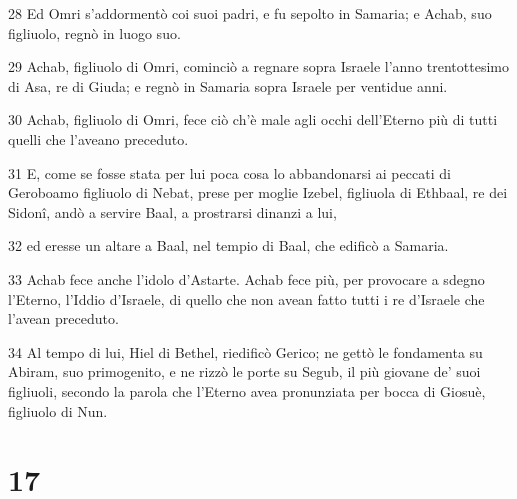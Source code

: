 \par 28 Ed Omri s'addormentò coi suoi padri, e fu sepolto in Samaria; e Achab, suo figliuolo, regnò in luogo suo.
\par 29 Achab, figliuolo di Omri, cominciò a regnare sopra Israele l'anno trentottesimo di Asa, re di Giuda; e regnò in Samaria sopra Israele per ventidue anni.
\par 30 Achab, figliuolo di Omri, fece ciò ch'è male agli occhi dell'Eterno più di tutti quelli che l'aveano preceduto.
\par 31 E, come se fosse stata per lui poca cosa lo abbandonarsi ai peccati di Geroboamo figliuolo di Nebat, prese per moglie Izebel, figliuola di Ethbaal, re dei Sidonî, andò a servire Baal, a prostrarsi dinanzi a lui,
\par 32 ed eresse un altare a Baal, nel tempio di Baal, che edificò a Samaria.
\par 33 Achab fece anche l'idolo d'Astarte. Achab fece più, per provocare a sdegno l'Eterno, l'Iddio d'Israele, di quello che non avean fatto tutti i re d'Israele che l'avean preceduto.
\par 34 Al tempo di lui, Hiel di Bethel, riedificò Gerico; ne gettò le fondamenta su Abiram, suo primogenito, e ne rizzò le porte su Segub, il più giovane de' suoi figliuoli, secondo la parola che l'Eterno avea pronunziata per bocca di Giosuè, figliuolo di Nun.

\chapter{17}


